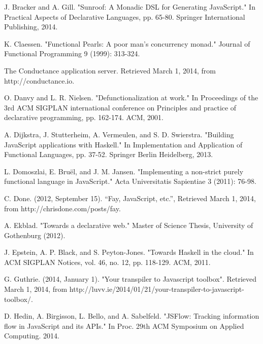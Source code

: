 \documentclass[preprint]{sigplanconf}
\begin{document}
\begin{thebibliography}{}
\softraggedright

J. Bracker and A. Gill. "Sunroof: A Monadic DSL for Generating JavaScript." In Practical Aspects of Declarative Languages, pp. 65-80. Springer International Publishing, 2014.

K. Claessen. "Functional Pearls: A poor man's concurrency monad." Journal of Functional Programming 9 (1999): 313-324.

The Conductance application server. Retrieved March 1, 2014, from http://conductance.io.

O. Danvy and L. R. Nielsen. "Defunctionalization at work." In Proceedings of the 3rd ACM SIGPLAN international conference on Principles and practice of declarative programming, pp. 162-174. ACM, 2001.

A. Dijkstra, J. Stutterheim, A. Vermeulen, and S. D. Swierstra. "Building JavaScript applications with Haskell." In Implementation and Application of Functional Languages, pp. 37-52. Springer Berlin Heidelberg, 2013.

L. Domoszlai, E. Bruël, and J. M. Jansen. "Implementing a non-strict purely functional language in JavaScript." Acta Universitatis Sapientiae 3 (2011): 76-98.

C. Done. (2012, September 15). ``Fay, JavaScript, etc.'', Retrieved March 1, 2014, from http://chrisdone.com/posts/fay.

A. Ekblad. "Towards a declarative web." Master of Science Thesis, University of Gothenburg (2012).

J. Epstein, A. P. Black, and S. Peyton-Jones. "Towards Haskell in the cloud." In ACM SIGPLAN Notices, vol. 46, no. 12, pp. 118-129. ACM, 2011.

G. Guthrie. (2014, January 1). "Your transpiler to Javascript toolbox". Retrieved March 1, 2014, from http://luvv.ie/2014/01/21/your-transpiler-to-javascript-toolbox/.

D. Hedin, A. Birgisson, L. Bello, and A. Sabelfeld. "JSFlow: Tracking information flow in JavaScript and its APIs." In Proc. 29th ACM Symposium on Applied Computing. 2014.


\end{thebibliography}
\end{document}
